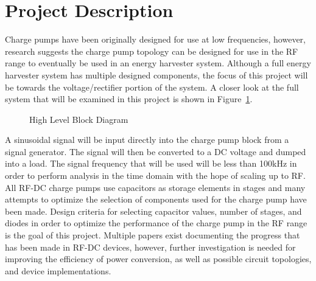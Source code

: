 \documentclass[12pt]{article}
\begin{document}
\section{Project Description}
Charge pumps have been originally designed for use at low frequencies, however, research suggests the charge pump topology can be designed for use in the RF range to eventually be used in an energy harvester system. Although a full energy harvester system has multiple designed components, the focus of this project will be towards the voltage/rectifier portion of the system. A closer look at the full system that will be examined in this project is shown in Figure~\ref{fig:HighLevel}.
	
\begin{figure}[H]
\caption{High Level Block Diagram}
\label{fig:HighLevel}
\end{figure}
	
\noindent A sinusoidal signal will be input directly into the charge pump block from a signal generator. The signal will then be converted to a DC voltage and dumped into a load. The signal frequency that will be used will be less than 100kHz in order to perform analysis in the time domain with the hope of scaling up to RF. \\

\noindent All RF-DC charge pumps use capacitors as storage elements in stages and many attempts to optimize the selection of components used for the charge pump have been made. Design criteria for selecting capacitor values, number of stages, and diodes in order to optimize the performance of the charge pump in the RF range is the goal of this project. Multiple papers exist documenting the progress that has been made in RF-DC devices, however, further investigation is needed for improving the efficiency of power conversion, as well as possible circuit topologies, and device implementations. 
	
\end{document}

